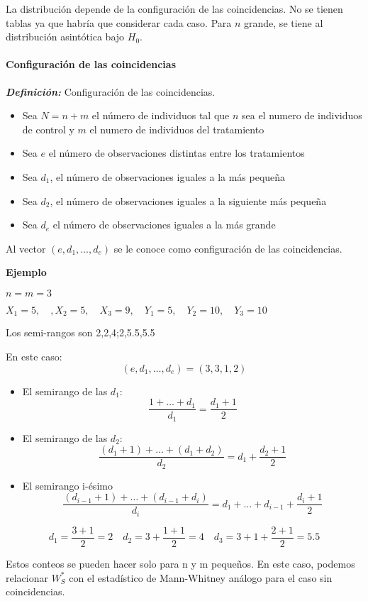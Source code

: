 La distribución depende de la configuración de las coincidencias. No se tienen tablas ya que habría que considerar cada caso.
Para $n$ grande, se tiene al distribución asintótica bajo $H_0$.

\paragraph{Configuración de las coincidencias}
\textit{\textbf{Definición: }}Configuración de las coincidencias. 
\begin{itemize}
    \item Sea $N=n+m$ el número de individuos tal que $n$ sea el numero de individuos de control y $m$ el numero de individuos del tratamiento
    \item Sea $e$ el número de observaciones distintas entre los tratamientos
    \item Sea $d_1$, el número de observaciones iguales a la más pequeña
    \item Sea $d_2$, el número de observaciones iguales a la siguiente más pequeña
    \item Sea $d_e$ el número de observaciones iguales a la más grande
\end{itemize}

Al vector $(e,d_1,\dots,d_e)$ se le conoce como configuración de las coincidencias.

\textbf{Ejemplo}

$n=m=3$

\(
X_1=5, \quad, X_2=5, \quad X_3=9, \quad Y_1=5,\quad Y_2=10,\quad Y_3=10
\)

Los semi-rangos son 2,2,4;2,5.5,5.5

En este caso:
\[
    (e,d_1,\dots,d_e)=(3,3,1,2)
\]
\begin{itemize}
    \item El semirango de las $d_1$:
    \[
        \frac{1+\dots+d_1}{d_1}=\frac{d_1+1}{2}
    \]
    \item El semirango de las $d_2$:
    \[
        \frac{(d_1+1)+\dots+(d_1+d_2)}{d_2}=d_1+\frac{d_2+1}{2}
    \]
    \item El semirango i-ésimo
    \[
        \frac{(d_{i-1}+1)+\dots+(d_{i-1}+d_i)}{d_i}=d_1+\dots+d_{i-1}+\frac{d_i+1}{2}
    \]
\end{itemize}

\[
    d_1=\frac{3+1}{2}=2 \quad d_2=3+\frac{1+1}{2}=4 \quad d_3=3+1+\frac{2+1}{2}=5.5
\]

Estos conteos se pueden hacer solo para n y m pequeños. En este caso, podemos relacionar $W_S^*$ con el estadístico de Mann-Whitney análogo para el caso sin coincidencias.

